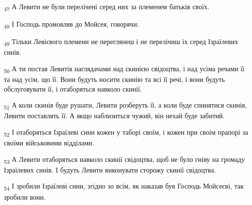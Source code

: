 \begin{tcolorbox}
\textsubscript{47} А Левити не були перелічені серед них за племенем батьків своїх.
\end{tcolorbox}
\begin{tcolorbox}
\textsubscript{48} І Господь промовляв до Мойсея, говорячи:
\end{tcolorbox}
\begin{tcolorbox}
\textsubscript{49} Тільки Левієвого племени не переглянеш і не перелічиш їх серед Ізраїлевих синів.
\end{tcolorbox}
\begin{tcolorbox}
\textsubscript{50} А ти постав Левитів наглядачами над скинією свідоцтва, і над усіма речами її та над усім, що її. Вони будуть носити скинію та всі її речі, і вони будуть обслуговувати її, і отаборяться навколо скинії.
\end{tcolorbox}
\begin{tcolorbox}
\textsubscript{51} А коли скинія буде рушати, Левити розберуть її, а коли буде спинятися скинія, Левити поставлять її. А якщо наблизиться чужий, він нехай буде забитий.
\end{tcolorbox}
\begin{tcolorbox}
\textsubscript{52} І отаборяться Ізраїлеві сини кожен у таборі своїм, і кожен при своїм прапорі за своїми військовими відділами.
\end{tcolorbox}
\begin{tcolorbox}
\textsubscript{53} А Левити отаборяться навколо скинії свідоцтва, щоб не було гніву на громаду Ізраїлевих синів. І будуть Левити виконувати сторожу скинії свідоцтва.
\end{tcolorbox}
\begin{tcolorbox}
\textsubscript{54} І зробили Ізраїлеві сини, згідно зо всім, як наказав був Господь Мойсеєві, так зробили вони.
\end{tcolorbox}
